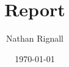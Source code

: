 \titlehead{\centering University of Hull}
\subject{600093 - Computational Science}
\title{Report}
\author{Nathan Rignall}
\date{\today}
\maketitle